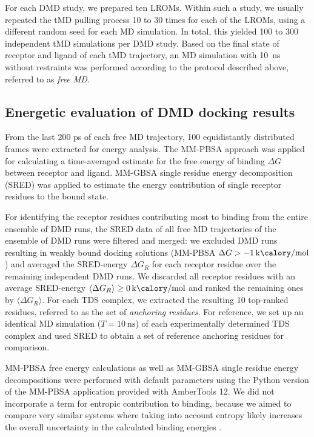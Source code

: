For each DMD study, we prepared ten LROMs. Within such a study, we usually
repeated the tMD pulling process 10 to 30 times for each of the LROMs, using a
different random seed for each MD simulation. In total, this yielded 100 to 300
independent tMD simulations per DMD study. Based on the final state of receptor
and ligand of each tMD trajectory, an MD simulation with \SI{10}{\nano\second}
without restraints was performed according to the protocol described above,
referred to as \textit{free MD}.


\subsection{Energetic evaluation of DMD docking results}


From the last 200 ps of each free MD trajectory, 100 equidistantly distributed
frames were extracted for energy analysis. The MM-PBSA \cite{mmpbsa_py} approach
was applied for calculating a time-averaged estimate for the free energy of
binding $\Delta G$ between receptor and ligand. MM-GBSA \cite{mmpbsa_py} single
residue energy decomposition (SRED) was applied to estimate the energy
contribution of single receptor residues to the bound state.

For identifying the receptor residues contributing most to binding from
the entire ensemble of DMD runs, the SRED data of all free MD trajectories of
the ensemble of DMD runs were filtered and merged: we excluded DMD runs resulting in weakly bound docking solutions (MM-PBSA $\Delta G >
\SI{-1}{\kilo\calory\per\mole} $) and averaged the SRED-energy $\Delta G_R$ for
each receptor residue over the remaining independent DMD runs. We discarded all
receptor residues with an average SRED-energy $\langle\Delta G_R\rangle \ge
\SI{0}{\kilo\calory\per\mole}$ and ranked the remaining ones by $\langle\Delta
G_R\rangle$. For each TDS complex, we extracted the resulting 10 top-ranked
residues, referred to as the set of \textit{anchoring residues}. For reference,
we set up an identical MD simulation ($T=\SI{10}{\nano\second}$) of each
experimentally determined TDS complex and used SRED to obtain a set of reference
anchoring residues for comparison.

MM-PBSA free energy calculations as well as MM-GBSA single residue energy
decompositions were performed with default parameters using the Python version
of the MM-PBSA application provided with AmberTools 12. We did not incorporate a
term for entropic contribution to binding, because we aimed to compare very
similar systems where taking into account entropy likely increases the overall
uncertainty in the calculated binding energies {\cite{Gandhi01102009,
homeyer_gohlke_2012}}.


